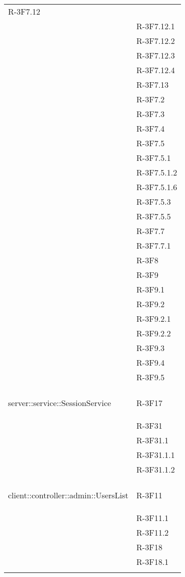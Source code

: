 \begin{longtable}{l p{3cm}}
	R-3F7.12 \tabularnewline &
	
	R-3F7.12.1 \tabularnewline &
	
	R-3F7.12.2 \tabularnewline &
	
	R-3F7.12.3 \tabularnewline &
	
	R-3F7.12.4 \tabularnewline &
	
	R-3F7.13 \tabularnewline &
	
	R-3F7.2 \tabularnewline &
	
	R-3F7.3 \tabularnewline &
	
	R-3F7.4 \tabularnewline &
	
	R-3F7.5 \tabularnewline &
	
	R-3F7.5.1 \tabularnewline &
	
	R-3F7.5.1.2 \tabularnewline &
	
	R-3F7.5.1.6 \tabularnewline &
	
	R-3F7.5.3 \tabularnewline &
	
	R-3F7.5.5 \tabularnewline &
	
	R-3F7.7 \tabularnewline &
	
	R-3F7.7.1 \tabularnewline &
	
	R-3F8 \tabularnewline &
	
	R-3F9 \tabularnewline &
	
	R-3F9.1 \tabularnewline &
	
	R-3F9.2 \tabularnewline &
	
	R-3F9.2.1 \tabularnewline &
	
	R-3F9.2.2 \tabularnewline &
	
	R-3F9.3 \tabularnewline &
	
	R-3F9.4 \tabularnewline &
	
	R-3F9.5 \tabularnewline &\tabularnewline
	\hline
	\hypertarget{server::service::SessionService}{server::service::SessionService} & R-3F17 \tabularnewline &
	
	R-3F31 \tabularnewline &
	
	R-3F31.1 \tabularnewline &
	
	R-3F31.1.1 \tabularnewline &
	
	R-3F31.1.2 \tabularnewline &\tabularnewline
	\hline
	\hypertarget{client::controller::admin::UsersList}{client::controller::admin::UsersList} & R-3F11 \tabularnewline &
	
	R-3F11.1 \tabularnewline &
	
	R-3F11.2 \tabularnewline &
	
	R-3F18 \tabularnewline &
	
	R-3F18.1 \tabularnewline &
	

\end{longtable}
